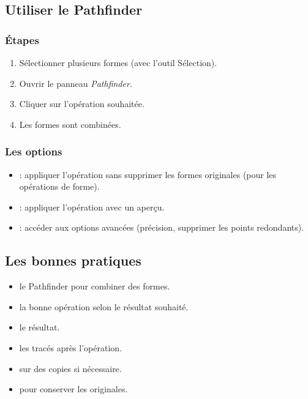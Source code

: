 \subsection{Utiliser le Pathfinder}

\subsubsection{Étapes}

\begin{enumerate}
    \item Sélectionner plusieurs formes (avec l'outil Sélection).
    \item Ouvrir le panneau \emph{Pathfinder}.
    \item Cliquer sur l'opération souhaitée.
    \item Les formes sont combinées.
\end{enumerate}

\subsubsection{Les options}

\begin{itemize}
    \item {} : appliquer l'opération sans supprimer les formes originales (pour les opérations de forme).
    \item {} : appliquer l'opération avec un aperçu.
    \item {} : accéder aux options avancées (précision, supprimer les points redondants).
\end{itemize}

\subsection{Les bonnes pratiques}

\begin{itemize}
    \item {} le Pathfinder pour combiner des formes.
    \item {} la bonne opération selon le résultat souhaité.
    \item {} le résultat.
    \item {} les tracés après l'opération.
    \item {} sur des copies si nécessaire.
    \item {} pour conserver les originales.
\end{itemize}

